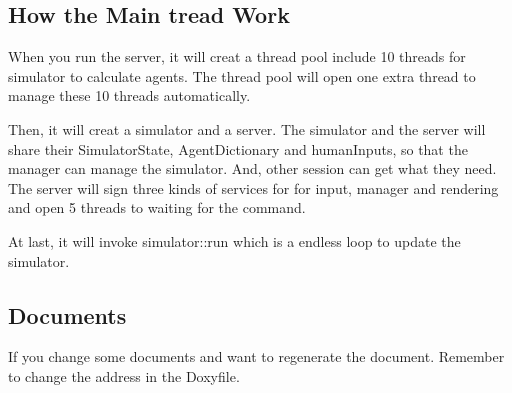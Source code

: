 \subsection*{How the Main tread Work}

When you run the server, it will creat a thread pool include 10 threads for simulator to calculate agents. The thread pool will open one extra thread to manage these 10 threads automatically.

Then, it will creat a simulator and a server. The simulator and the server will share their Simulator\+State, Agent\+Dictionary and human\+Inputs, so that the manager can manage the simulator. And, other session can get what they need. The server will sign three kinds of services for for input, manager and rendering and open 5 threads to waiting for the command.

At last, it will invoke simulator\+::run which is a endless loop to update the simulator.

\subsection*{Documents}

If you change some documents and want to regenerate the document. Remember to change the address in the Doxyfile. 